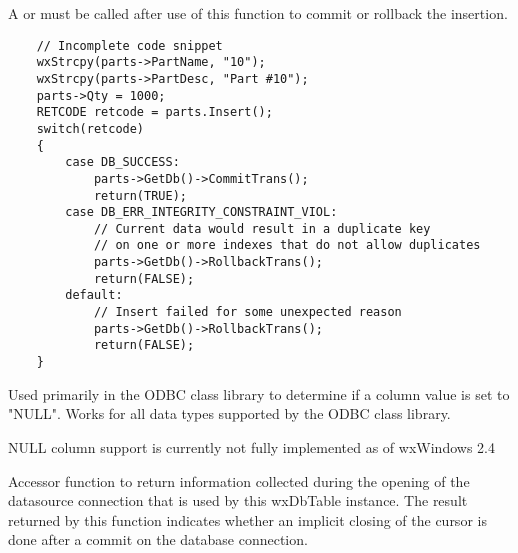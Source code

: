 
A  or 
 must be called after use of 
this function to commit or rollback the insertion.


\begin{verbatim}
    // Incomplete code snippet
    wxStrcpy(parts->PartName, "10");
    wxStrcpy(parts->PartDesc, "Part #10");
    parts->Qty = 1000;
    RETCODE retcode = parts.Insert();
    switch(retcode)
    {
        case DB_SUCCESS:
            parts->GetDb()->CommitTrans();
            return(TRUE);
        case DB_ERR_INTEGRITY_CONSTRAINT_VIOL:
            // Current data would result in a duplicate key
            // on one or more indexes that do not allow duplicates
            parts->GetDb()->RollbackTrans();
            return(FALSE);
        default:
            // Insert failed for some unexpected reason
            parts->GetDb()->RollbackTrans();
            return(FALSE);
    }
\end{verbatim}


\label{wxdbtableiscolnull}


Used primarily in the ODBC class library to determine if a column value is 
set to "NULL".  Works for all data types supported by the ODBC class library.




NULL column support is currently not fully implemented as of wxWindows 2.4


\label{wxdbtableiscursorclosedoncommit}


Accessor function to return information collected during the opening of the 
datasource connection that is used by this wxDbTable instance.  The result 
returned by this function indicates whether an implicit closing of the cursor is 
done after a commit on the database connection.


